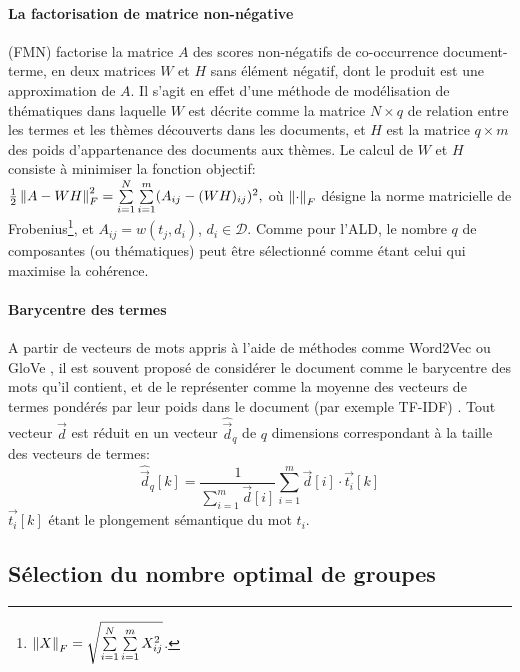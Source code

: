 \paragraph[NMF]{La factorisation de matrice non-négative} (FMN) \citep{paatero1994nmf} factorise la matrice $A$ des scores non-négatifs de co-occurrence document-terme, en deux matrices $W$ et $H$ sans élément négatif, dont le produit est une approximation de $A$. Il s'agit en effet d'une méthode de modélisation de thématiques dans laquelle $W$ est décrite comme la matrice $N\times q$ de relation entre les termes et les thèmes découverts dans les documents, et $H$ est la matrice $q\times m$ des poids d'appartenance des documents aux thèmes. Le calcul de $W$ et $H$ consiste à minimiser la fonction objectif: $\frac{1}{2}\left\lVert A - WH\right\rVert^2_F = \sum\limits_{i=1}^N\sum\limits_{i=1}^m (A_{ij} - (WH)_{ij})^2,$ où $\left\lVert\cdot\right\rVert_F$ désigne la norme matricielle de Frobenius\footnote{$\left\lVert X\right\rVert_F = \sqrt{\sum\limits_{i=1}^N\sum\limits_{i=1}^m X_{ij}^2}$.}, et $A_{ij} = w(t_j, d_i)$, $d_i \in \mathcal{D}$.  %
Comme pour l'ALD, le nombre $q$ de composantes (ou thématiques) peut être sélectionné comme étant celui qui  maximise la cohérence. 


\paragraph[w2v*TF-IDF]{Barycentre des termes}
A partir de vecteurs de mots appris à l'aide de méthodes comme Word2Vec \citep{mikolov2013word2vec} ou GloVe \citep{pennington2014glove}, il est souvent proposé de considérer le document comme le barycentre des mots qu'il contient, et de le représenter comme la moyenne des vecteurs de termes pondérés par leur poids dans le document (par exemple TF-IDF) \citep{quoc2014doc2vec, charlet2018simbow_coria,arora2017wordAvgSentEmbedd}. Tout vecteur $\vec{d}$ est réduit en un vecteur $\hat{\vec{d}}_q$ de $q$ dimensions  correspondant à la taille des vecteurs de termes: \[\hat{\vec{d}}_q[k] = \frac{1}{\sum\limits_{i=1}^m \vec{d}[i]} \sum\limits_{i=1}^{m}\vec{d}[i]\cdot\vec{t_i}[k]\]
$\vec{t_i}[k]$ étant le plongement sémantique du mot $t_i$.

\subsection{Sélection du nombre optimal de groupes}
\label{sec:similarite:k-optimal}

